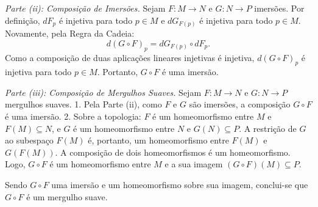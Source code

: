 {	\textit{Parte (ii): Composição de Imersões.}
	Sejam $F: M \to N$ e $G: N \to P$ imersões. Por definição, $dF_p$ é injetiva para todo $p \in M$ e $dG_{F(p)}$ é injetiva para todo $p \in M$. 
	Novamente, pela Regra da Cadeia:
	\begin{equation*}
		d(G \circ F)_p = dG_{F(p)} \circ dF_p.
	\end{equation*}
	Como a composição de duas aplicações lineares injetivas é injetiva, $d(G \circ F)_p$ é injetiva para todo $p \in M$. Portanto, $G \circ F$ é uma imersão.
	
	\textit{Parte (iii): Composição de Mergulhos Suaves.}
	Sejam $F: M \to N$ e $G: N \to P$ mergulhos suaves.
	1. Pela Parte (ii), como $F$ e $G$ são imersões, a composição $G \circ F$ é uma imersão.
	2. Sobre a topologia: $F$ é um homeomorfismo entre $M$ e $F(M) \subseteq N$, e $G$ é um homeomorfismo entre $N$ e $G(N) \subseteq P$. A restrição de $G$ ao subespaço $F(M)$ é, portanto, um homeomorfismo entre $F(M)$ e $G(F(M))$. 
	A composição de dois homeomorfismos é um homeomorfismo. Logo, $G \circ F$ é um homeomorfismo entre $M$ e a sua imagem $(G \circ F)(M) \subseteq P$.
	
	Sendo $G \circ F$ uma imersão e um homeomorfismo sobre sua imagem, conclui-se que $G \circ F$ é um mergulho suave.
}


